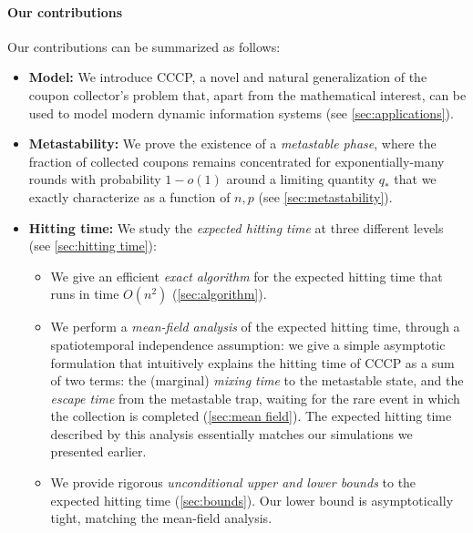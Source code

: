 \documentclass[11pt,a4paper]{article}
\begin{document}
\paragraph*{Our contributions}
Our contributions can be summarized as follows:
\begin{itemize}
    \item \textbf{Model:} We introduce CCCP, a novel and natural generalization of the coupon collector's problem that, apart from the mathematical interest, can be used to model modern dynamic information systems (see \cref{sec:applications}).
    \item \textbf{Metastability:} We prove the existence of a \textit{metastable phase}, where the fraction of collected coupons remains concentrated for exponentially-many rounds with probability $1-o(1)$ around a limiting quantity $q_*$ that we exactly characterize as a function of $n,p$ (see \cref{sec:metastability}).
    \item \textbf{Hitting time:} We study the \textit{expected hitting time} at three different levels (see \cref{sec:hitting time}):
    \begin{itemize}
        \item We give an efficient \textit{exact algorithm} for the expected hitting time that runs in time $O(n^2)$ (\cref{sec:algorithm}).
        \item We perform a \textit{mean-field analysis} of the expected hitting time, through a spatiotemporal independence assumption: we give a simple asymptotic formulation that intuitively explains the hitting time of CCCP as a sum of two terms: the (marginal) \textit{mixing time} to the metastable state, and the \textit{escape time} from the metastable trap, waiting for the rare event in which the collection is completed (\cref{sec:mean field}). The expected hitting time described by this analysis essentially matches our simulations we presented earlier.
        \item We provide rigorous \textit{unconditional upper and lower bounds} to the expected hitting time (\cref{sec:bounds}). Our lower bound is asymptotically tight, matching the mean-field analysis.
    \end{itemize}
\end{itemize}
\end{document}
